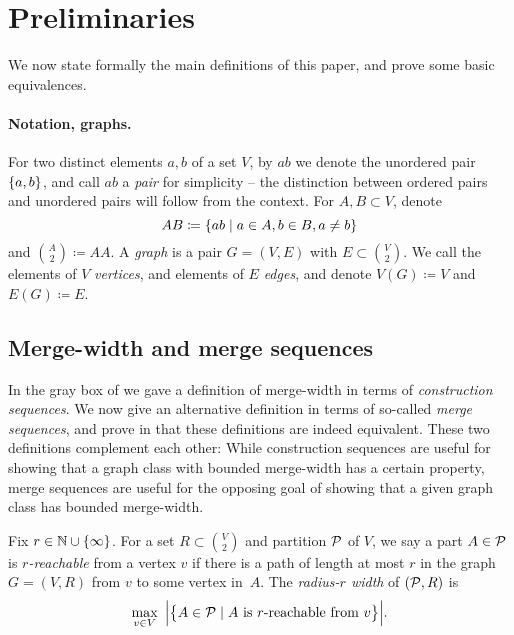\section{Preliminaries}\label{sec:prelims}

We now state formally the main definitions of this paper, and prove some basic equivalences. 

       \paragraph{Notation, graphs.}
       For two distinct elements $a,b$ of a set $V$,
by $ab$ we denote the unordered pair $\set{a,b}$, and call $ab$ a \emph{pair} for simplicity
-- the distinction between ordered pairs and unordered pairs will follow from the context.
For $A,B\subset V$, denote $$AB\coloneqq \setof{ab}{a\in A,b\in B,a\neq b}$$ and ${A\choose 2}\coloneqq AA$.
A \emph{graph} is a pair $G=(V,E)$ with $E\subset {V\choose 2}$.
We call the elements of $V$ \emph{vertices}, and elements of $E$ \emph{edges}, and denote $V(G)\coloneqq V$ and $E(G)\coloneqq E$. 

\subsection{Merge-width and merge sequences}\label{sec:merge-sequence}

In the gray box of  we gave a definition of merge-width in terms of \emph{construction sequences}.
We now give an alternative definition in terms of so-called \emph{merge sequences}, and prove in 
that these definitions are indeed equivalent.
These two definitions complement each other: 
While construction sequences are useful for showing that a graph class with bounded merge-width has a certain property,
merge sequences are useful for the opposing goal of showing that a given graph class has bounded merge-width.





\medskip



    Fix $r\in\N\cup\set{\infty}$.
        For a set $R\subset {V\choose 2}$ and partition $\cal P$ of $V$,
        we say a part \(A \in \cal P\) is \emph{\(r\)-reachable} from a vertex \(v\) if there is a path of length at most $r$ in the graph $G=(V,R)$ from $v$ to some vertex in~$A$.
        The \emph{radius-$r$ width} of $(\cal P,R)$  is 
        \[
           \max_{v \in V}\ \Big|\bigl\{ A \in \cal P \mid  A \text{ is \(r\)-reachable from } v \bigr\}\Big|.
        \]
        
